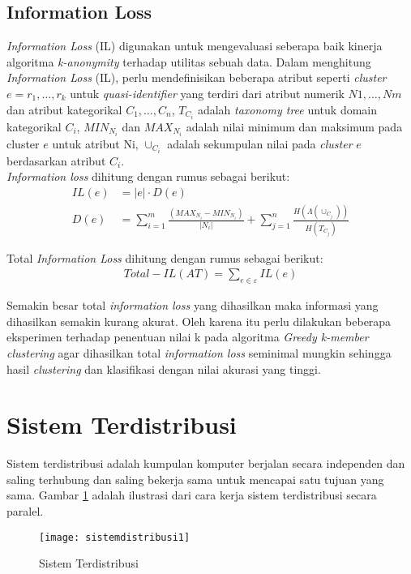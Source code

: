 \subsection{Information Loss}
\textit{Information Loss} (IL) digunakan untuk mengevaluasi seberapa baik kinerja algoritma \textit{k-anonymity} terhadap utilitas sebuah data. Dalam menghitung \textit{Information Loss} (IL), perlu mendefinisikan beberapa atribut seperti \textit{cluster} $e = {r_1,\ldots,r_k}$  untuk \textit{quasi-identifier} yang terdiri dari atribut numerik ${N1,\ldots, Nm}$ dan atribut kategorikal ${C_1,\ldots,C_n}$, $T_{C_i}$ adalah \textit{taxonomy tree} untuk domain kategorikal $C_i$, $MIN_{N_i}$ dan $MAX_{N_i}$ adalah nilai minimum dan maksimum pada cluster $e$ untuk atribut Ni, $\cup_{C_i}$ adalah sekumpulan nilai pada \textit{cluster} $e$ berdasarkan atribut $C_i$. \\

\noindent \textit{Information loss} dihitung dengan rumus sebagai berikut:
\begin{align}
IL(e)&= |e| \cdot D(e) \\
D(e) &= \sum_{i=1}^{m} \frac{(MAX_{N_i} - MIN_{N_i})}{|N_i|} + \sum_{j=1}^{n}\frac{H(\Lambda(\cup_{C_j}))}{H(T_{C_j})}
\end{align}

\noindent Total \textit{Information Loss} dihitung dengan rumus sebagai berikut:
\begin{align}
Total-IL(AT) = \sum_{e \in \varepsilon}^{}  IL(e)
\end{align}

\noindent Semakin besar total \textit{information loss} yang dihasilkan maka informasi yang dihasilkan semakin kurang akurat. Oleh karena itu perlu dilakukan beberapa eksperimen terhadap penentuan nilai k pada algoritma \textit{Greedy k-member clustering} agar dihasilkan total \textit{information loss} seminimal mungkin sehingga hasil \textit{clustering} dan klasifikasi dengan nilai akurasi yang tinggi.

\section{Sistem Terdistribusi}
Sistem terdistribusi adalah kumpulan komputer berjalan secara independen dan saling terhubung dan saling bekerja sama untuk mencapai satu tujuan yang sama. Gambar   \ref{fig:sistemdistribusi1} adalah ilustrasi dari cara kerja sistem terdistribusi secara paralel.

\begin{figure}[H]
	\centering
	\texttt{[image: sistemdistribusi1]}
	\caption{Sistem Terdistribusi}
	\label{fig:sistemdistribusi1}
\end{figure}


